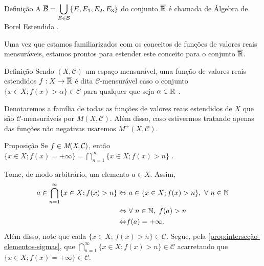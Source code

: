     \begin{env}{Definição}
    \label{def:algebra-borel-estendida}
        A \sigal $\overline{\operatorname{\mathcal{B}}} = \displaystyle \bigcup_{E \in \operatorname{\mathcal{B}}} \{E, E_1, E_2, E_3\}$ do conjunto $\operatorname{\overline{\mathbb{R}}}$ é chamada de Álgebra de Borel Estendida \cite{bartle}.
    \end{env}

    Uma vez que estamos familiarizados com os conceitos de funções de valores reais mensuráveis, estamos prontos para estender este conceito para o conjunto $\operatorname{\overline{\mathbb{R}}}$.
    \begin{env}{Definição}
    \label{def:familia-funcoes-mensuraveis}
        Sendo $(X, \mathcal{C})$ um espaço mensurável, uma função de valores reais estendidos $f: X \to \operatorname{\overline{\mathbb{R}}}$ é dita $\mathcal{C}$-mensurável caso o conjunto
        $\{x \in X; f(x) > \alpha\} \in \mathcal{C}$ para qualquer que seja $\alpha \in \mathbb{R}$ \cite{bartle}. 
        \vspace{-0.4cm}
    \end{env}

	Denotaremos a família de todas as funções de valores reais estendidos de $X$ que são $\mathcal{C}$-mensuráveis por $M(X, \mathcal{C})$.
	Além disso, caso estivermos tratando apenas das funções não negativas usaremos $M^+(X, \mathcal{C})$.
    \begin{env}{Proposição}
    \label{prop:identidade-intersecao-mais-infinito}
        Se $f \in \operatorname{\textit{M}(\textit{X}, \mathcal{C} )}$, então $\{x \in X; f(x) = +\infty\} = \displaystyle \bigcap_{n = 1}^\infty \{x \in X; f(x) > n\}$
        \cite{bartle}.
    \end{env}
    \begin{prova}
        Tome, de modo arbitrário, um elemento $a \in X$. 
        Assim, 
        \begin{align*}
            a \in \bigcap_{n = 1}^\infty \{x \in X; f(x) > n\} 
            \Leftrightarrow &\ a \in \{x \in X; f(x) > n\}, \ \forall\  n \in \N\\
            \Leftrightarrow &\  \forall\ n \in \N,\ f(a) > n\\
            \Leftrightarrow & f(a) = +\infty.  
        \end{align*}
    Além disso, note que cada $\{x \in X;\, f(x) > n\} \in \mathcal{C}$.
    Segue, pela \ref{prop:interseção-elementos-sigmas}, que \linebreak $\displaystyle \bigcap_{n = 1}^\infty \{x \in X; f(x) > n\} \in \mathcal{C}$ acarretando que $\{x \in X; f(x) = +\infty\} \in \mathcal{C}$. 
    \end{prova}

